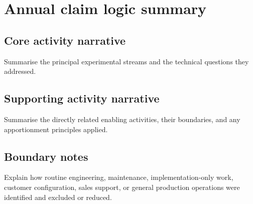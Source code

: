 \documentclass[11pt]{article}
\begin{document}
\section{Annual claim logic summary}
\subsection{Core activity narrative}
Summarise the principal experimental streams and the technical questions they addressed.

\subsection{Supporting activity narrative}
Summarise the directly related enabling activities, their boundaries, and any apportionment principles applied.

\subsection{Boundary notes}
Explain how routine engineering, maintenance, implementation-only work, customer configuration, sales support, or general production operations were identified and excluded or reduced.

\RDEndMatter
\end{document}
